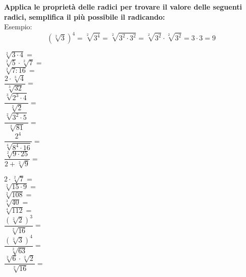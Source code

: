 \documentclass[14pt]{extarticle}
\begin{document}
\textbf{Applica le proprietà delle radici per trovare il valore delle seguenti radici, semplifica il più possibile il radicando:}\\
Esempio:\[(\sqrt[2]{3})^4=\sqrt[2]{3^4}=\sqrt[2]{3^2\cdot3^2}=\sqrt[2]{3^2}\cdot\sqrt[2]{3^2}=3\cdot3=9\]
\begin{spacing}{3}
\begin{minipage}[t]{0.5\textwidth}
\(\sqrt[2]{3\cdot4}=\)\\
\(\sqrt[2]{5}\cdot\sqrt[2]{7}=\)\\
\(\sqrt[2]{7:16}=\)\\
\(\dfrac{2\cdot\sqrt[3]{4}}{\sqrt[3]{32}}=\)\\ 
\(\dfrac{\sqrt[3]{2^3\cdot 4}}{\sqrt[2]{2}}=\)\\
\(\dfrac{\sqrt[2]{3^2\cdot 5}}{\sqrt[2]{81}}=\)\\
\(\dfrac{2^4}{\sqrt[4]{8^4\cdot 16}}=\)\\
\(\dfrac{\sqrt[2]{9\cdot 25}}{2+\sqrt[2]{9}}=\)\\
\end{minipage}
\begin{minipage}[t]{0.5\textwidth}
\(2\cdot\sqrt[2]{7}=\)\\
\(\sqrt[2]{15\cdot9}=\)\\
\(\sqrt[2]{108}=\)\\ 
\(\sqrt[3]{40}=\)\\
\(\sqrt[4]{112}=\)\\
\(\dfrac{(\sqrt[2]{2})^3}{\sqrt[2]{16}}=\)\\
\(\dfrac{(\sqrt[2]{3})^4}{\sqrt[2]{63}}=\)\\
\(\dfrac{\sqrt[2]{6}\cdot\sqrt[2]{2}}{\sqrt[2]{16}}=\)
\end{minipage}
\end{spacing}
\end{document}
